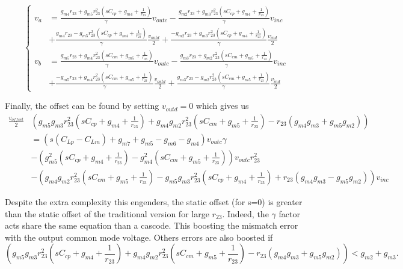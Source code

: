 \[
\begin{cases}
v_a &= \frac{g_{m4}r_{23}+g_{m5}r_{23}^2\left(sC_{cp}+g_{m4}+\frac{1}{r_{23}}\right)}{\gamma} v_{outc} - \frac{g_{m2}r_{23}+g_{m3}r_{23}^2\left(sC_{cp}+g_{m4}+\frac{1}{r_{23}}\right)}{\gamma} v_{inc} \\
&+ \frac{g_{m4}r_{23}-g_{m5}r_{23}^2\left(sC_{cp}+g_{m4}+\frac{1}{r_{23}}\right)}{\gamma} \frac{v_{outd}}{2} + \frac{-g_{m2}r_{23}+g_{m3}r_{23}^2\left(sC_{cp}+g_{m4}+\frac{1}{r_{23}}\right)}{\gamma} \frac{v_{ind}}{2} \\
v_b &= \frac{g_{m5}r_{23}+g_{m4}r_{23}^2\left(sC_{cm}+g_{m5}+\frac{1}{r_{23}}\right)}{\gamma} v_{outc} - \frac{g_{m3}r_{23}+g_{m2}r_{23}^2\left(sC_{cm}+g_{m5}+\frac{1}{r_{23}}\right)}{\gamma} v_{inc} \\
&+ \frac{-g_{m5}r_{23}+g_{m4}r_{23}^2\left(sC_{cm}+g_{m5}+\frac{1}{r_{23}}\right)}{\gamma} \frac{v_{outd}}{2} + \frac{g_{m3}r_{23}-g_{m2}r_{23}^2\left(sC_{cm}+g_{m5}+\frac{1}{r_{23}}\right)}{\gamma} \frac{v_{ind}}{2}
\end{cases}
\]

Finally, the offset can be found by setting \(v_{outd} = 0\) which gives us 
\small
\begin{align}
    \frac{v_{offset}}{2} & \left(g_{m5}g_{m3}r_{23}^2\left(sC_{cp}+g_{m4}+\frac{1}{r_{23}}\right)+g_{m4}g_{m2}r_{23}^2\left(sC_{cm}+g_{m5}+\frac{1}{r_{23}}\right)-r_{23}\left(g_{m4}g_{m3}+g_{m5}g_{m2} \right) \right) \\
 &= \left(s\left(C_{Lp}-C_{Lm}\right)+g_{m7}+g_{m5}-g_{m6}-g_{m4}\right) v_{outc}\gamma \nonumber \\
 &- \left(g_{m5}^2\left(sC_{cp}+g_{m4}+\frac{1}{r_{23}}\right)-g_{m4}^2\left(sC_{cm}+g_{m5}+\frac{1}{r_{23}}\right)\right) v_{outc}r_{23}^2  \nonumber \\
 &- \left(g_{m4}g_{m2}r_{23}^2\left(sC_{cm}+g_{m5}+\frac{1}{r_{23}}\right)-g_{m5}g_{m3}r_{23}^2\left(sC_{cp}+g_{m4}+\frac{1}{r_{23}}\right)+r_{23}\left(g_{m4}g_{m3}-g_{m5}g_{m2}\right) \right) v_{inc} \nonumber
\end{align}
\normalsize

Despite the extra complexity this engenders, the static offset (for s=0) is greater than the static offset of the traditional version for large \(r_{23}\). Indeed, the \(\gamma\) factor acts share the same equation than a cascode. This boosting the mismatch error with the output common mode voltage. Others errors are also boosted if \small \[ \left(g_{m5}g_{m3}r_{23}^2\left(sC_{cp}+g_{m4}+\frac{1}{r_{23}}\right)+g_{m4}g_{m2}r_{23}^2\left(sC_{cm}+g_{m5}+\frac{1}{r_{23}}\right)-r_{23}\left(g_{m4}g_{m3}+g_{m5}g_{m2} \right) \right) < g_{m2}+g_{m3}.\]
\normalsize

